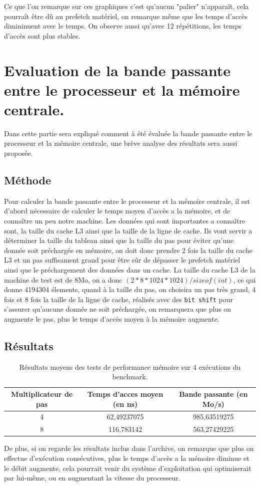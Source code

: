 \documentclass{rapport}
\begin{document}
    Ce que l'on remarque sur ces graphiques c'est qu'aucun "palier" n'apparaît, cela pourraît être dû au prefetch matériel, on remarque même que les temps d'accès dimininuent avec le temps.\newline
    On observe aussi qu'avec 12 répétitions, les temps d'accès sont plus stables.

    \clearpage
    
    \section{Evaluation de la bande passante entre le processeur et la mémoire centrale.}
    Dans cette partie sera expliqué comment à été évaluée la bande passante entre le processeur et la mémoire centrale, une brève analyse des résultats sera aussi proposée. \newline
    \subsection{Méthode}
    Pour calculer la bande passante entre le processeur et la mémoire centrale, il est d'abord nécessaire de calculer le temps moyen d'accès a la mémoire, et de connaître un peu notre machine. Les données qui sont importantes a connaître sont, la taille du cache L3 ainsi que la taille de la ligne de cache. Ils vont servir a déterminer la taille du tableau ainsi que la taille du pas pour éviter qu'une donnée soit préchargée en mémoire, on doit donc prendre 2 fois la taille du cache L3 et un pas suffisament grand pour être sûr de dépasser le prefetch matériel ainsi que le préchargement des données dans un cache. \newline
    La taille du cache L3 de la machine de test est de 8Mo, on a donc $(2 * 8 * 1024 * 1024)/sizeof(int)$, ce qui donne 4194304 élements, quand à la taille du pas, on choisira un pas très grand, 4 fois et 8 fois la taille de la ligne de cache, réalisés avec des \texttt{bit shift} pour s'assurer qu'aucune donnée ne soit préchargée, on remarquera que plus on augmente le pas, plus le temps d'accès moyen à la mémoire augmente.
    \subsection{Résultats}
    \begin{table}[H]
    \centering
    \begin{tabular}{c|c|c}
    Multiplicateur de pas & Temps d'acces moyen (en ns) & Bande passante (en Mo/s) \\
    \hline
     4 & 62,49237075 & 985,63519275 \\
     8 & 116,783142 & 563,27429225 \\
    \end{tabular}
    \caption{Résultats moyens des tests de performance mémoire sur 4 exécutions du benchmark.}
    \end{table}
    De plus, si on regarde les résultats inclus dans l'archive, on remarque que plus on effectue d'exécution consécutives, plus le temps d'accès a la mémoire diminue et le débit augmente, cela pourrait venir du système d'exploitation qui optimiserait par lui-même, ou en augmentant la vitesse du processeur.
\end{document}
